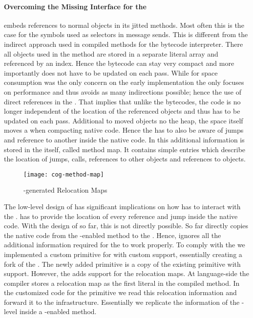 \paragraph{Overcoming the Missing \VM Interface for the \JIT}
\Cog embeds references to normal \PH objects in its jitted methods.
Most often this is the case for the symbols used as selectors in message sends.
This is different from the indirect approach used in compiled methods for the bytecode interpreter.
There all objects used in the method are stored in a separate literal array and referenced by an index.
Hence the bytecode can stay very compact and more importantly does not have to be updated on each \GC pass.
While for space consumption was the only concern on the early \ST implementation the \JIT only focuses on performance and thus avoids as many indirections possible; hence the use of direct references in the \JIT.
That implies that unlike the bytecodes, the \JIT code is no longer independent of the location of the referenced objects and thus has to be updated on each \GC pass.
Additional to moved objects no the \PH heap, the \JIT space itself moves a \CogMethod when compacting native code.
Hence the \GC has to also be aware of jumps and reference to another \CogMethod inside the native code.
In \Cog this additional information is stored in the \CogMethod itself, called method map.
It contains simple entries which describe the location of jumps, calls, references to other \CogMethod objects and references to \PH objects.
%
\begin{figure}[h]
	\centering
	\texttt{[image: cog-method-map]}
	\caption{\Nabujito-generated Relocation Maps}
\end{figure}

The low-level design of \Cog has significant implications on how \NBJ has to interact with the \VM.
\NBJ has to provide the location of every reference and jump inside the native code.
With the design of \NBJ so far, this is not directly possible.
So far \NBJ directly copies the native code from the \B-enabled method to the \CogMethod.
Hence, \NBJ ignores all the additional information required for the \JIT to work properly.
To comply with the \JIT we implemented a custom primitive for \NBJ with custom \JIT support, essentially creating a fork of the \VM.
The newly added primitive is a copy of the existing \B primitive with \JIT support.
However, the \NBJ adds support for the \CogMethod relocation maps.
At language-side the \NBJ compiler stores a relocation map as the first literal in the compiled method. 
In the customized \JIT code for the \NBJ primitive we read this relocation information and forward it to the \Cog \JIT infrastructure.
Essentially we replicate the information of the \JIT-level \CogMethod inside a \B-enabled \PH method.

